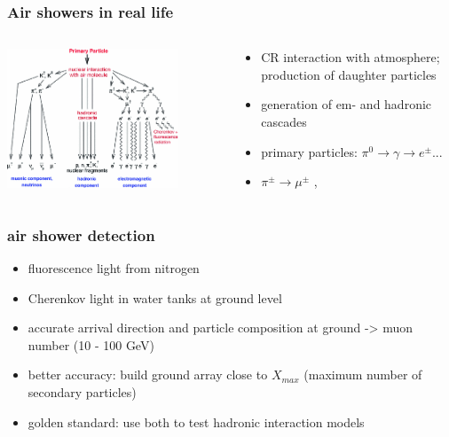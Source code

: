 \documentclass[aspectratio=1610, 9pt]{beamer}
\begin{document}
\begin{frame}\frametitle{Air showers in real life}
  \begin{columns}
    \begin{column}[c]{0.48\textwidth}
      \includegraphics[width=0.8\textwidth]{shower.png}
    \end{column}
    \begin{column}[c]{0.48\textwidth}
      \begin{itemize}
        \item CR interaction with atmosphere; production of daughter particles
        \item generation of em- and hadronic cascades
        \item primary particles: $\pi^0 \to \gamma \to e^{\pm}$...
        \item $\pi^{\pm} \to \mu^{\pm}$ , \nu
      \end{itemize}
    \end{column}
  \end{columns}
\end{frame}

\begin{frame}\frametitle{air shower detection}
  \begin{itemize}
    \item fluorescence light from nitrogen
    \item Cherenkov light in water tanks at ground level
    \item accurate arrival direction and particle composition at ground -> muon number (10 - 100 GeV)
    \item better accuracy: build ground array close to $X_{max}$ (maximum number of secondary particles)
    \item golden standard: use both to test hadronic interaction models
  \end{itemize}
\end{frame}
\end{document}
